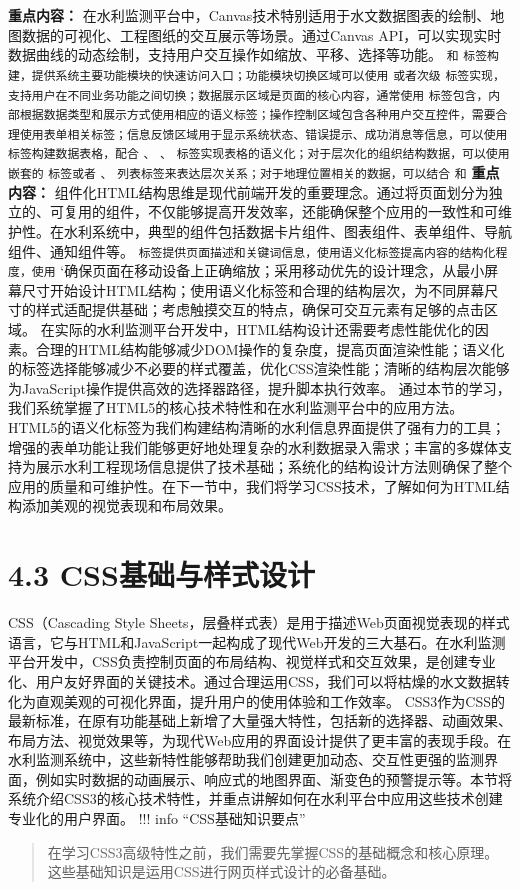 \textbf{重点内容：} 在水利监测平台中，Canvas技术特别适用于水文数据图表的绘制、地图数据的可视化、工程图纸的交互展示等场景。通过Canvas API，可以实现实时数据曲线的动态绘制，支持用户交互操作如缩放、平移、选择等功能。
\texttt{和} \texttt{标签构建，提供系统主要功能模块的快速访问入口；功能模块切换区域可以使用} \texttt{或者次级} \texttt{标签实现，支持用户在不同业务功能之间切换；数据展示区域是页面的核心内容，通常使用}
\texttt{标签包含，内部根据数据类型和展示方式使用相应的语义标签；操作控制区域包含各种用户交互控件，需要合理使用表单相关标签；信息反馈区域用于显示系统状态、错误提示、成功消息等信息，可以使用} \texttt{标签构建数据表格，配合}
\texttt{、} \texttt{、} \texttt{标签实现表格的语义化；对于层次化的组织结构数据，可以使用嵌套的} \texttt{标签或者} \texttt{、}
\texttt{列表标签来表达层次关系；对于地理位置相关的数据，可以结合} \texttt{和} \textbf{重点内容：}
组件化HTML结构思维是现代前端开发的重要理念。通过将页面划分为独立的、可复用的组件，不仅能够提高开发效率，还能确保整个应用的一致性和可维护性。在水利系统中，典型的组件包括数据卡片组件、图表组件、表单组件、导航组件、通知组件等。
\texttt{标签提供页面描述和关键词信息，使用语义化标签提高内容的结构化程度，使用}
`确保页面在移动设备上正确缩放；采用移动优先的设计理念，从最小屏幕尺寸开始设计HTML结构；使用语义化标签和合理的结构层次，为不同屏幕尺寸的样式适配提供基础；考虑触摸交互的特点，确保可交互元素有足够的点击区域。
在实际的水利监测平台开发中，HTML结构设计还需要考虑性能优化的因素。合理的HTML结构能够减少DOM操作的复杂度，提高页面渲染性能；语义化的标签选择能够减少不必要的样式覆盖，优化CSS渲染性能；清晰的结构层次能够为JavaScript操作提供高效的选择器路径，提升脚本执行效率。
通过本节的学习，我们系统掌握了HTML5的核心技术特性和在水利监测平台中的应用方法。HTML5的语义化标签为我们构建结构清晰的水利信息界面提供了强有力的工具；增强的表单功能让我们能够更好地处理复杂的水利数据录入需求；丰富的多媒体支持为展示水利工程现场信息提供了技术基础；系统化的结构设计方法则确保了整个应用的质量和可维护性。在下一节中，我们将学习CSS技术，了解如何为HTML结构添加美观的视觉表现和布局效果。
\section{4.3 CSS基础与样式设计}\label{cssux57faux7840ux4e0eux6837ux5f0fux8bbeux8ba1} CSS（Cascading Style
Sheets，层叠样式表）是用于描述Web页面视觉表现的样式语言，它与HTML和JavaScript一起构成了现代Web开发的三大基石。在水利监测平台开发中，CSS负责控制页面的布局结构、视觉样式和交互效果，是创建专业化、用户友好界面的关键技术。通过合理运用CSS，我们可以将枯燥的水文数据转化为直观美观的可视化界面，提升用户的使用体验和工作效率。
CSS3作为CSS的最新标准，在原有功能基础上新增了大量强大特性，包括新的选择器、动画效果、布局方法、视觉效果等，为现代Web应用的界面设计提供了更丰富的表现手段。在水利监测系统中，这些新特性能够帮助我们创建更加动态、交互性更强的监测界面，例如实时数据的动画展示、响应式的地图界面、渐变色的预警提示等。本节将系统介绍CSS3的核心技术特性，并重点讲解如何在水利平台中应用这些技术创建专业化的用户界面。
!!! info ``CSS基础知识要点'' \begin{quote}
 在学习CSS3高级特性之前，我们需要先掌握CSS的基础概念和核心原理。这些基础知识是运用CSS进行网页样式设计的必备基础。 
\end{quote}
